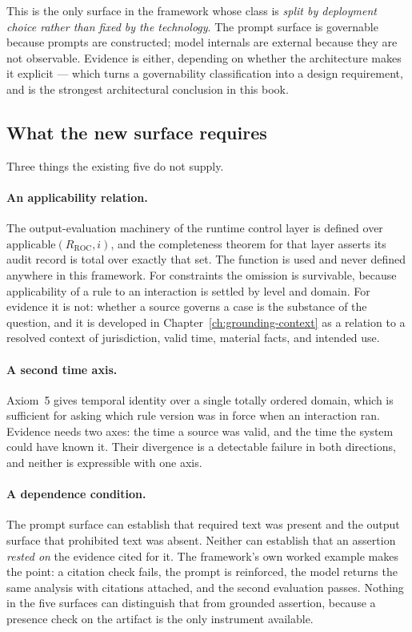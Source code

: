 This is the only surface in the framework whose class is \emph{split by deployment
choice rather than fixed by the technology}. The prompt surface is governable because
prompts are constructed; model internals are external because they are not observable.
Evidence is either, depending on whether the architecture makes it explicit --- which
turns a governability classification into a design requirement, and is the strongest
architectural conclusion in this book.

\subsection{What the new surface requires}

Three things the existing five do not supply.

\paragraph{An applicability relation.} The output-evaluation machinery of the runtime
control layer is defined over $\mathrm{applicable}(R_{\mathrm{ROC}}, i)$, and the
completeness theorem for that layer asserts its audit record is total over exactly that
set. The function is used and never defined anywhere in this framework. For constraints
the omission is survivable, because applicability of a rule to an interaction is
settled by level and domain. For evidence it is not: whether a source governs a case is
the substance of the question, and it is developed in
Chapter~\ref{ch:grounding-context} as a relation to a resolved context of jurisdiction,
valid time, material facts, and intended use.

\paragraph{A second time axis.} Axiom~5 gives temporal identity over a single totally
ordered domain, which is sufficient for asking which rule version was in force when an
interaction ran. Evidence needs two axes: the time a source was valid, and the time the
system could have known it. Their divergence is a detectable failure in both
directions, and neither is expressible with one axis.

\paragraph{A dependence condition.} The prompt surface can establish that required text
was present and the output surface that prohibited text was absent. Neither can establish
that an assertion \emph{rested on} the evidence cited for it. The framework's own worked
example makes the point: a citation check fails, the prompt is reinforced, the model
returns the same analysis with citations attached, and the second evaluation passes.
Nothing in the five surfaces can distinguish that from grounded assertion, because a
presence check on the artifact is the only instrument available.


